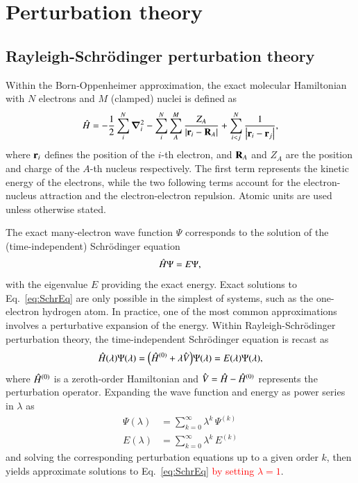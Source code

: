 \documentclass[aps,prb,reprint,noshowkeys,superscriptaddress]{revtex4-1}
\newcommand{\titou}[1]{\textcolor{red}{#1}}
\newcommand{\Ne}{N} %
\newcommand{\Nn}{M} %
\newcommand{\hH}{\Hat{H}}
\newcommand{\hV}{\Hat{V}}
\begin{document}
\section{Perturbation theory}

\subsection{Rayleigh-Schr\"odinger perturbation theory}

Within the Born-Oppenheimer approximation, the exact molecular Hamiltonian with $\Ne$ electrons and 
$\Nn$ (clamped) nuclei is defined as
\begin{equation}\label{eq:ExactHamiltonian}
    \hH = 
    - \frac{1}{2} \sum_{i}^{\Ne} \grad_i^2 
    - \sum_{i}^{\Ne} \sum_{A}^{\Nn} \frac{Z_A}{\abs{\vb{r}_i-\vb{R}_A}} 
    + \sum_{i<j}^{\Ne}\frac{1}{\abs{\vb{r}_i-\vb{r}_j}},
\end{equation}
where $\vb{r}_i$ defines the position of the $i$-th electron, and $\vb{R}_{A}$ and $Z_{A}$ are the position
and charge of the $A$-th nucleus respectively.
The first term represents the kinetic energy of the electrons, while 
the two following terms account for the electron-nucleus attraction and the electron-electron repulsion.
Atomic units are used unless otherwise stated.

The exact many-electron wave function $\Psi$ corresponds to the solution of the (time-independent)
Schr\"{o}dinger equation
\begin{equation} 
	\hH\Psi = E \Psi,
    \label{eq:SchrEq}
\end{equation} 
with the eigenvalue $E$ providing the exact energy.
Exact solutions to Eq.~\eqref{eq:SchrEq} are only possible in the simplest of systems, such as 
the one-electron hydrogen atom. 
In practice, one of the most common approximations involves
a perturbative expansion of the energy.
Within Rayleigh-Schr\"odinger perturbation theory, the time-independent Schr\"odinger equation 
is recast as 
\begin{equation} 
	\hH(\lambda) \Psi(\lambda) 
    = \qty(\hH^{(0)} + \lambda \hV ) \Psi(\lambda) 
    = E(\lambda) \Psi(\lambda),
    \label{eq:SchrEq-PT}
\end{equation}
where $\hH^{(0)}$ is a zeroth-order Hamiltonian and $\hV = \hH - \hH^{(0)}$ represents the perturbation operator.
Expanding the wave function and energy as power series in $\lambda$ as 
\begin{subequations}
\begin{align}
    \Psi(\lambda) &= \sum_{k=0}^{\infty} \lambda^{k}\,\Psi^{(k)} 
    \label{eq:psi_expansion}
    \\
    E(\lambda) &= \sum_{k=0}^{\infty} \lambda^{k}\,E^{(k)}
    \label{eq:E_expansion}
\end{align}
\end{subequations}
and solving the corresponding perturbation equations up to a given order $k$, then 
yields approximate solutions to Eq.~\eqref{eq:SchrEq} \titou{by setting $\lambda = 1$}.
\end{document}
